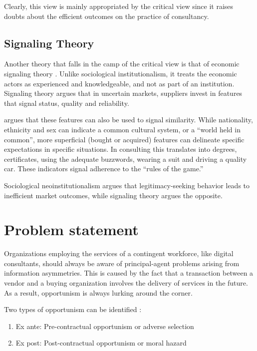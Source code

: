 \documentclass[12pt]{article}
\providecommand{\tightlist}{%
  \setlength{\itemsep}{0pt}\setlength{\parskip}{0pt}}
\begin{document}
Clearly, this view is mainly appropriated by the critical view since it
raises doubts about the efficient outcomes on the practice of
consultancy.

\hypertarget{signaling-theory}{%
\subsection{Signaling Theory}\label{signaling-theory}}

Another theory that falls in the camp of the critical view is that of
economic signaling theory \citep[ 8-10]{armbruster2006}. Unlike
sociological institutionalism, it treats the economic actors as
experienced and knowledgeable, and not as part of an institution.
Signaling theory argues that in uncertain markets, suppliers invest in
features that signal status, quality and reliability.

\citet[15-16]{zucker1985} argues that these features can also be used to
signal similarity. While nationality, ethnicity and sex can indicate a
common cultural system, or a ``world held in common'', more superficial
(bought or acquired) features can delineate specific expectations in
specific situations. In consulting this translates into degrees,
certificates, using the adequate buzzwords, wearing a suit and driving a
quality car. These indicators signal adherence to the ``rules of the
game.''

Sociological neoinstitutionalism argues that legitimacy-seeking behavior
leads to inefficient market outcomes, while signaling theory argues the
opposite.

\hypertarget{problem-statement}{%
\section{Problem statement}\label{problem-statement}}

Organizations employing the services of a contingent workforce, like
digital consultants, should always be aware of principal-agent problems
arising from information asymmetries. This is caused by the fact that a
transaction between a vendor and a buying organization involves the
delivery of services in the future. As a result, opportunism is always
lurking around the corner.

Two types of opportunism can be identified \citet[242]{clark1993}:

\begin{enumerate}
\def\labelenumi{\arabic{enumi}.}
\tightlist
\item
  Ex ante: Pre-contractual opportunism or adverse selection
\item
  Ex post: Post-contractual opportunism or moral hazard
\end{enumerate}
\end{document}
